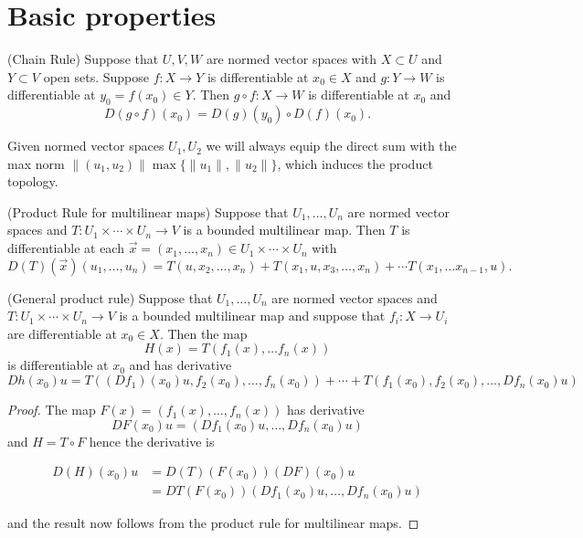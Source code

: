 \documentclass[twoside, a4paper, 10pt]{amsart}
\begin{document}
\section{Basic properties}

\begin{lemma}(Chain Rule) Suppose that $U,V,W$ are normed vector spaces with $X \subset U$ and $Y \subset V$ open sets. Suppose $f:X \to Y$ is differentiable at $x_0 \in X$ and $g:Y \to W$ is differentiable at $y_0 = f(x_0) \in Y$. Then $g \circ f:X \to W$ is differentiable at $x_0$ and $$D(g \circ f)(x_0) = D(g)(y_0) \circ D(f)(x_0).$$ \end{lemma}

Given normed vector spaces $U_1, U_2$ we will always equip the direct sum with the max norm $\|(u_1, u_2)\| \max \{\|u_1\|, \|u_2 \| \}$, which induces the product topology.

\begin{lemma}(Product Rule for multilinear maps) Suppose that $U_1, \ldots, U_n$ are normed vector spaces and $T: U_1 \times \cdots \times U_n \to V$ is a bounded multilinear map. Then $T$ is differentiable at each $\vec{x} = (x_1, \ldots, x_n) \in U_1 \times \cdots \times U_n $ with $$D(T)(\vec{x})(u_1, \ldots, u_n) = T(u, x_2, \ldots, x_n) + T(x_1, u, x_3, \ldots, x_n) + \cdots T(x_1, \ldots x_{n-1}, u). $$\end{lemma}

\begin{lemma}(General product rule)  Suppose that $U_1, \ldots, U_n$ are normed vector spaces and $T: U_1 \times \cdots \times U_n \to V$ is a bounded multilinear map and suppose that $f_i:X \to U_i$ are differentiable at $x_0 \in X$. Then the map $$ H(x) = T(f_1(x), \ldots f_n(x)) $$ is differentiable at $x_0$ and has derivative $$Dh(x_0)u = T((Df_1)(x_0)u, f_2(x_0), \ldots, f_n(x_0)) + \cdots + T(f_1(x_0), f_2(x_0), \ldots, Df_n(x_0)u)$$\end{lemma}

\begin{proof} The map $F(x)=(f_1(x), \ldots, f_n(x))$ has derivative $$DF(x_0)u =(Df_1(x_0)u, \ldots, Df_n(x_0)u)$$ and $H = T \circ F$ hence the derivative is 

\begin{align*} D(H)(x_0)u &= D(T)(F(x_0))(DF)(x_0)u \\ &= DT(F(x_0)) (Df_1(x_0)u, \ldots, Df_n(x_0)u)  \end{align*}

and the result now follows from the product rule for multilinear maps.

 \end{proof}
\end{document}
